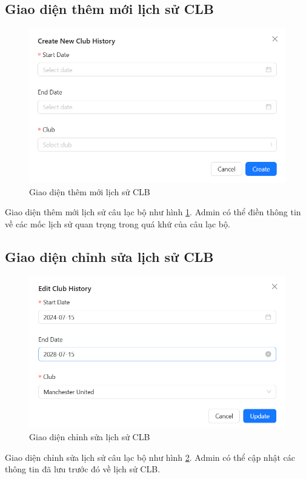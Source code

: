 \documentclass[../BTL.tex]{subfiles}
\begin{document}
\subsection{Giao diện thêm mới lịch sử CLB}
\begin{figure}
    \centering
    \includegraphics[width=1\linewidth]{Hinhve/admin_add_club_history.png}
    \caption{Giao diện thêm mới lịch sử CLB}
    \label{fig:admin_add_club_history}
\end{figure}
Giao diện thêm mới lịch sử câu lạc bộ như hình \ref{fig:admin_add_club_history}. Admin có thể điền thông tin về các mốc lịch sử quan trọng trong quá khứ của câu lạc bộ.

\subsection{Giao diện chỉnh sửa lịch sử CLB}
\begin{figure}
    \centering
    \includegraphics[width=1\linewidth]{Hinhve/admin_edit_club_history.png}
    \caption{Giao diện chỉnh sửa lịch sử CLB}
    \label{fig:admin_edit_club_history}
\end{figure}
Giao diện chỉnh sửa lịch sử câu lạc bộ như hình \ref{fig:admin_edit_club_history}. Admin có thể cập nhật các thông tin đã lưu trước đó về lịch sử CLB.
\end{document}
